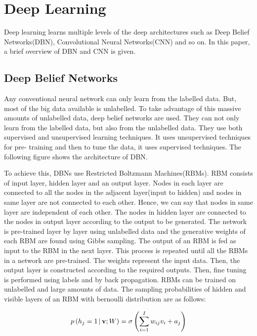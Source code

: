 \documentclass[sigconf]{acmart}
\begin{document}
\section{Deep Learning}
Deep learning learns multiple levels of the deep architectures such as Deep Belief Networks(DBN), Convolutional Neural Networks(CNN) and so on. In this paper, a brief overview of DBN and CNN is given.

\subsection{Deep Belief Networks}
Any conventional neural network can only learn from the labelled data. But, most of the big data available is unlabelled. To take advantage of this massive amounts of unlabelled data, deep belief networks are used. They can not only learn from the labelled data, but also from the unlabelled data. They use both supervised and unsupervised learning techniques. It uses unsupervised techniques for pre- training and then to tune the data, it uses supervised techniques. The following figure shows the architecture of DBN.



To achieve this, DBNs use Restricted Boltzmann Machines(RBMs). RBM consists of input layer, hidden layer and an output layer. Nodes in each layer are connected to all the nodes in the adjacent layer(input to hidden) and nodes in same layer are not connected to each other. Hence, we can say that nodes in same layer are independent of each other. The nodes in hidden layer are connected to the nodes in output layer according to the output to be generated. The network is pre-trained layer by layer using unlabelled data and the generative weights of each RBM are found using Gibbs sampling\cite{Hinton2006}. The output of an RBM is fed as input to the RBM in the next layer. This process is repeated until all the RBMs in a network are pre-trained. The weights represent the input data. Then, the output layer is constructed according to the required outputs. Then, fine tuning is performed using labels and by back propagation. RBMs can be trained on unlabelled and large amounts of data. The sampling probabilities of hidden and visible layers of an RBM with bernoulli distribution are as follows:

\begin{equation} p\left ( {h_{j}=1}\thinspace \vert \thinspace {\mathbf {v};W}\right ) =\sigma \left ( \sum \limits _{i=1}^I {w_{ij}v_{i}+a_{j}} \right )\end{equation}
\end{document}
